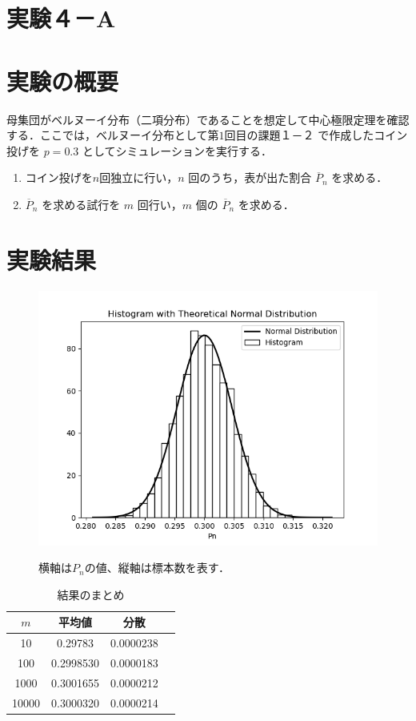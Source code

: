 \documentclass[fleqn, a4paper. 12pt]{ltjsarticle} %
\begin{document}
\section*{実験４－A}
\section*{実験の概要}
母集団がベルヌーイ分布（二項分布）であることを想定して中心極限定理を確認する．ここでは，ベルヌーイ分布として第$1$回目の課題１－２ で作成したコイン投げを $p = 0.3$ としてシミュレーションを実行する．
\begin{enumerate}
  \item コイン投げを$n$回独立に行い，$n$ 回のうち，表が出た割合 $\overline{P}_n$ を求める．
  \item $\overline{P}_n$ を求める試行を $m$ 回行い，$m$ 個の $\overline{P}_n$ を求める．
\end{enumerate}
\section*{実験結果}
\begin{figure}[tb]
  \centering
  \includegraphics[width = \textwidth]{my_plot_4_A.png}
  \label{f13}
  \caption{横軸は$P_n$の値、縦軸は標本数を表す．}
\end{figure}
\begin{table}[h]
  \centering
  \caption{結果のまとめ}
  \begin{tabular}{cccc}
      \toprule
      $m$ & 平均値 & 分散 \\
      \midrule
      10    & 0.29783   & 0.0000238 \\
      100   & 0.2998530 & 0.0000183 \\
      1000  & 0.3001655 & 0.0000212 \\
      10000 & 0.3000320 & 0.0000214 \\
      \bottomrule
  \end{tabular}
\end{table}
\end{document}
